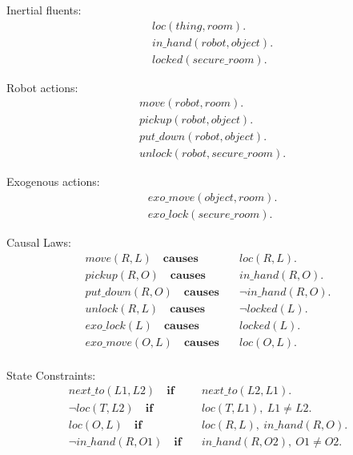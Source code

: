 \documentclass[11pt, oneside]{article}
\begin{document}
Inertial fluents:
\begin{align*}
  &loc(thing, room).\\
  &in\_hand(robot,object).\\
  &locked(secure\_room).
\end{align*}

Robot actions:
\begin{align*}
  &move(robot, room).\\
  &pickup(robot,object).\\
  &put\_down(robot,object).\\
  &unlock(robot,secure\_room).
\end{align*}

Exogenous actions:
\begin{align*}
  &exo\_move(object, room).\\
  &exo\_lock(secure\_room).
\end{align*}

Causal Laws:
\begin{align*}
  move(R,L)\quad \mathbf{causes}&\quad loc(R,L).\\
  pickup(R,O)\quad \mathbf{causes}&\quad in\_hand(R,O). \\
  put\_down(R,O)\quad \mathbf{causes}&\quad \neg in\_hand(R,O).\\
  unlock(R,L)\quad \mathbf{causes}&\quad \neg locked(L).\\
  exo\_lock(L)\quad \mathbf{causes}&\quad locked(L).\\
  exo\_move(O,L)\quad \mathbf{causes}&\quad loc(O,L).\\
\end{align*}


State Constraints:
\begin{align*}
  next\_to(L1,L2)\quad \mathbf{if}&\quad next\_to(L2,L1).\\
  \neg loc(T, L2)\quad \mathbf{if}&\quad loc(T, L1), ~L1 \neq L2.\\
  loc(O, L)\quad \mathbf{if}&\quad loc(R, L),~in\_hand(R,O).\\
  \neg in\_hand(R,O1)\quad \mathbf{if}&\quad in\_hand(R,O2),~ O1 \neq O2.
\end{align*}
\end{document}
